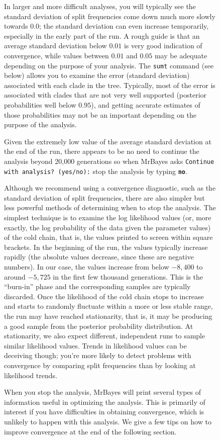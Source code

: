 \documentclass[12pt]{book}
\newcommand{\ttt}[1]{\texttt{#1}}
\newcommand{\tb}[1]{\ttt{\textbf{#1}}}
\begin{document}
\begin{figure}[h]
In larger and more difficult analyses, you will typically see the standard deviation of split
frequencies come down much more slowly towards 0.0; the standard deviation can even increase
temporarily, especially in the early part of the run. A rough guide is that an average standard
deviation below $0.01$ is very good indication of convergence, while values between $0.01$ and
$0.05$ may be adequate depending on the purpose of your analysis. The \ttt{sumt} command (see
below) allows you to examine the error (standard deviation) associated with each clade in the tree.
Typically, most of the error is associated with clades that are not very well supported (posterior
probabilities well below $0.95$), and getting accurate estimates of those probabilities may not be
an important depending on the purpose of the analysis.

Given the extremely low value of the average standard deviation at the end of the run, there
appears to be no need to continue the analysis beyond 20,000 generations so when MrBayes asks
\ttt{Continue with analysis? (yes/no):} stop the analysis by typing \tb{no}.

Although we recommend using a convergence diagnostic, such as the standard deviation of split
frequencies, there are also simpler but less powerful methods of determining when to stop the
analysis. The simplest technique is to examine the log likelihood values (or, more exactly, the log
probability of the data given the parameter values) of the cold chain, that is, the values printed
to screen within square brackets. In the beginning of the run, the values typically increase
rapidly (the absolute values decrease, since these are negative numbers). In our case, the values
increase from below $-8,400$ to around $-5,725$ in the first few thousand generations. This is the
``burn-in'' phase and the corresponding samples are typically discarded. Once the likelihood of
the cold chain stops to increase and starts to randomly fluctuate within a more or less stable
range, the run may have reached stationarity, that is, it may be producing a good sample from the
posterior probability distribution. At stationarity, we also expect different, independent runs to
sample similar likelihood values. Trends in likelihood values can be deceiving though; you're more
likely to detect problems with convergence by comparing split frequencies than by looking at
likelihood trends.

When you stop the analysis, MrBayes will print several types of information useful in optimizing
the analysis. This is primarily of interest if you have difficulties in obtaining convergence,
which is unlikely to happen with this analysis. We give a few tips on how to improve convergence at
the end of the following section.


\end{figure}
\end{document}
